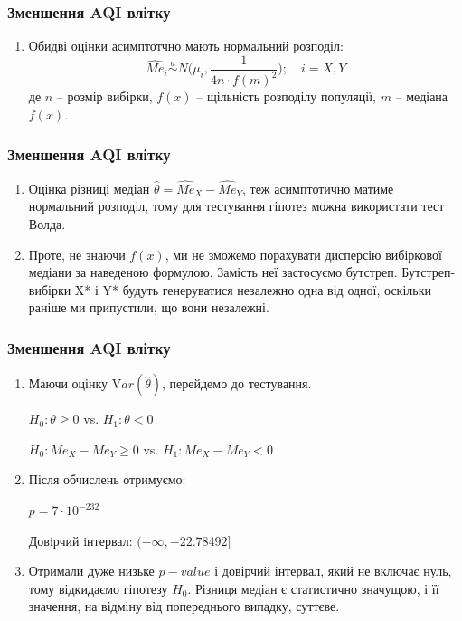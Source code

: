 \documentclass{beamer}
\begin{document}
\begin{frame}
  \frametitle{Зменшення AQI влітку}

  \begin{enumerate}
    \item Обидві оцінки асимптотчно мають нормальний розподіл:
    $$\hat{Me}_i \overset{a}{\sim} N \bigg(\mu_i, \frac{1}{4n \cdot f(m)^2} \bigg); \quad i = X, Y$$
    де $n$ -- розмір вибірки, $f(x)$ -- щільність розподілу популяції, \linebreak $m$ -- медіана $f(x)$.   
  \end{enumerate}
  
\end{frame}

\begin{frame}
  \frametitle{Зменшення AQI влітку}

  \begin{enumerate}
    \item Оцінка різниці медіан $\hat{\theta} = \hat{Me}_X - \hat{Me}_Y$, теж асимптотично
    матиме нормальний розподіл, тому для тестування гіпотез можна використати тест Волда.  
    
    \item Проте, не знаючи $f(x)$, ми не зможемо порахувати дисперсію вибіркової медіани
    за наведеною формулою. Замість неї застосуємо бутстреп. Бутстреп-вибірки X* і Y* будуть
    генеруватися незалежно одна від одної, оскільки раніше ми припустили, що вони незалежні.  
  \end{enumerate}
\end{frame}

\begin{frame}
  \frametitle{Зменшення AQI влітку}

  \begin{enumerate}
    \item Маючи оцінку $\mathrm Var(\hat{\theta})$, перейдемо до тестування.  

    $H_0: \theta \ge 0$ vs. $H_1: \theta < 0$  
  
    $H_0: Me_X - Me_Y \ge 0$ vs. $H_1: Me_X - Me_Y < 0$

    \item Після обчислень отримуємо:
    
    $p = 7 \cdot 10^{-232}$

    Довiрчий iнтервал: $ (- \infty, -22.78492] $

    \item Отримали дуже низьке $p-value$ і довірчий інтервал, 
    який не включає нуль, тому відкидаємо гіпотезу $H_0$. 
    Різниця медіан є статистично значущою, і її значення, 
    на відміну від попереднього випадку, суттєве.
  \end{enumerate}
\end{frame}
\end{document}
